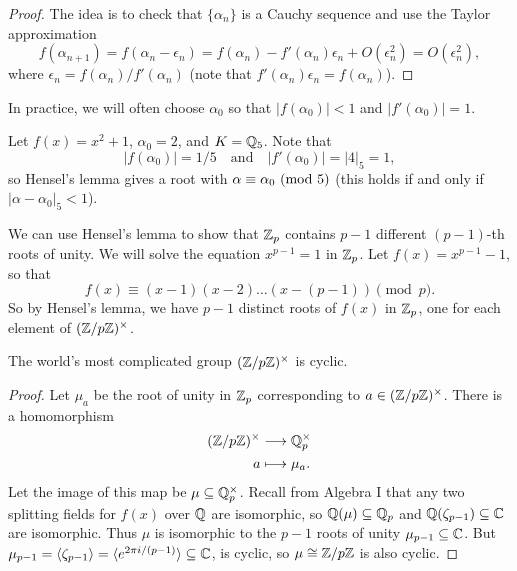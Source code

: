 \begin{proof}
  The idea is to check that $\{\alpha_n\}$ is a
  Cauchy sequence and use the
  Taylor approximation
  \[
    f(\alpha_{n + 1}) = f(\alpha_n - \epsilon_n)
    = f(\alpha_n) - f'(\alpha_n) \epsilon_n + O(\epsilon_n^2)
    = O(\epsilon_n^2)
  ,\]
  where $\epsilon_n = f(\alpha_n) / f'(\alpha_n)$
  (note that $f'(\alpha_n) \epsilon_n = f(\alpha_n)$).
\end{proof}

\begin{remark}
  In practice, we will often choose $\alpha_0$ so that
  $|f(\alpha_0)| < 1$ and $|f'(\alpha_0)| = 1$.
\end{remark}

\begin{example}
  Let $f(x) = x^2 + 1$, $\alpha_0 = 2$, and
  $K = \mathbb{Q}_5$. Note that
  \[
    |f(\alpha_0)| = 1 / 5
    \quad \text{and} \quad
    |f'(\alpha_0)| = |4|_5 = 1,
  \]
  so Hensel's lemma gives a root with
  $\alpha \equiv \alpha_0 \ (\mathrm{mod}\ 5)$ (this holds if and
  only if $|\alpha - \alpha_0|_5 < 1$).
\end{example}

\begin{example}
  We can use Hensel's lemma to show that
  $\mathbb{Z}_p$ contains $p - 1$ different $(p - 1)$-th
  roots of unity. We will solve the equation
  $x^{p - 1} = 1$ in $\mathbb{Z}_p$. Let $f(x) = x^{p - 1} - 1$,
  so that
  \[
    f(x) \equiv (x - 1)(x - 2) \dots (x - (p - 1)) \pmod{p}.
  \]
  So by Hensel's lemma, we have $p - 1$ distinct
  roots of $f(x)$ in $\mathbb{Z}_p$, one for each
  element of $(\mathbb{Z} / p\mathbb{Z})^\times$.
\end{example}

\begin{theorem}[Baker]
  The world's most complicated group
  $(\mathbb{Z} / p\mathbb{Z})^\times$ is cyclic.
\end{theorem}

\begin{proof}
  Let $\mu_a$ be the root of unity in $\mathbb{Z}_p$
  corresponding to $a \in (\mathbb{Z} / p\mathbb{Z})^\times$.
  There is a homomorphism
  \begin{align*}
    (\mathbb{Z} / p\mathbb{Z})^\times
    &\longrightarrow \mathbb{Q}_p^\times \\
    a &\longmapsto \mu_a.
  \end{align*}
  Let the image of this map be
  $\mu \subseteq \mathbb{Q}_p^\times$. Recall from
  Algebra I that any two splitting fields for
  $f(x)$ over $\mathbb{Q}$ are isomorphic, so
  $\mathbb{Q}(\mu) \subseteq \mathbb{Q}_p$ and
  $\mathbb{Q}(\zeta_{p - 1}) \subseteq \mathbb{C}$ are isomorphic.
  Thus $\mu$ is isomorphic to the $p - 1$ roots of
  unity $\mu_{p - 1} \subseteq \mathbb{C}$.
  But $\mu_{p - 1} = \langle \zeta_{p - 1} \rangle = \langle e^{2\pi i / (p - 1)} \rangle \subseteq \mathbb{C}$,
  is cyclic, so $\mu \cong \mathbb{Z} / p\mathbb{Z}$ is also cyclic.
\end{proof}
